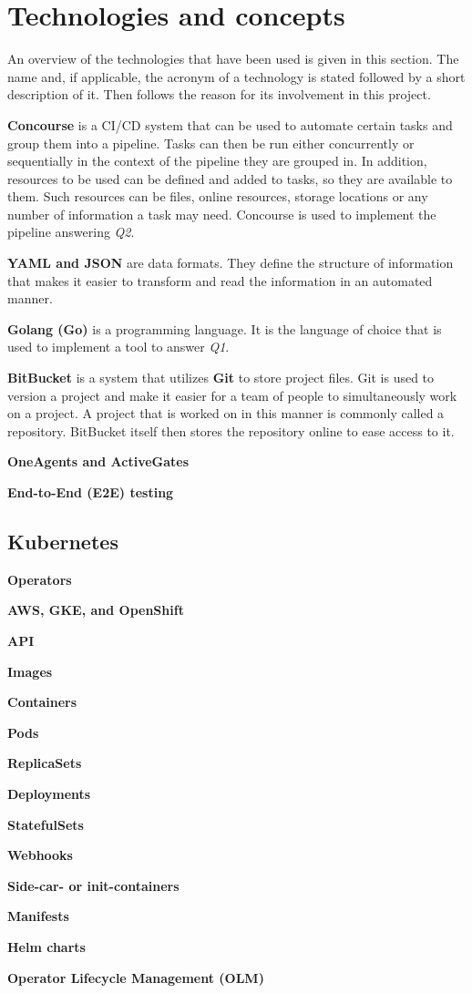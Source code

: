 \chapter{Technologies and concepts}\label{ch:technologies-used}

An overview of the technologies that have been used is given in this section.
The name and, if applicable, the acronym of a technology is stated followed by a short description of it.
Then follows the reason for its involvement in this project.

\textbf{Concourse} is a CI/CD system that can be used to automate certain tasks and group them into a pipeline.
Tasks can then be run either concurrently or sequentially in the context of the pipeline they are grouped in.
In addition, resources to be used can be defined and added to tasks, so they are available to them.
Such resources can be files, online resources, storage locations or any number of information a task may need.
Concourse is used to implement the pipeline answering \textit{Q2}.

\textbf{YAML and JSON} are data formats.
They define the structure of information that makes it easier to transform and read the information in an automated manner.

\textbf{Golang (Go)} is a programming language.
It is the language of choice that is used to implement a tool to answer \textit{Q1}.

\textbf{BitBucket} is a system that utilizes \textbf{Git} to store project files.
Git is used to version a project and make it easier for a team of people to simultaneously work on a project.
A project that is worked on in this manner is commonly called a repository.
BitBucket itself then stores the repository online to ease access to it.

\textbf{OneAgents and ActiveGates}

\textbf{End-to-End (E2E) testing}

\section{Kubernetes}\label{sec:kubernetes}

\textbf{Operators}

\textbf{AWS, GKE, and OpenShift}

\textbf{API}

\textbf{Images}

\textbf{Containers}

\textbf{Pods}

\textbf{ReplicaSets}

\textbf{Deployments}

\textbf{StatefulSets}

\textbf{Webhooks}

\textbf{Side-car- or init-containers}

\textbf{Manifests}

\textbf{Helm charts}

\textbf{Operator Lifecycle Management (OLM)}